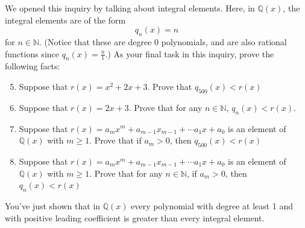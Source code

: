 \documentclass[11pt]{article}
\newenvironment{task}
	{\begin{mdframed}[linecolor=lightgray, linewidth=3pt]\raggedright}
	{\end{mdframed}}
\theoremstyle{definition}
\begin{document}
\begin{task}
We opened this inquiry by talking about integral elements. Here, in $\mathbb{Q}(x)$, the integral elements are of the form
\[ q_n(x) = n \]
for $n\in\mathbb{N}$. (Notice that these are degree 0 polynomials, and are also rational functions since $q_n(x) = \frac{n}{1}$.) As your final task in
this inquiry, prove the following facts:

\begin{enumerate}
    \setcounter{enumi}{4}
  \item Suppose that $r(x) =  x^2 + 2x + 3$. Prove that $q_{500}(x) < r(x)$
        \vspace{1.5in}
  \item Suppose that $r(x) =  2x + 3$. Prove that for any $n\in\mathbb{N}$, $q_n(x) < r(x)$.
        \vspace{1.5in}
  \item Suppose that $r(x) =  a_mx^m + a_{m-1}x_{m-1}+\cdots a_1x + a_0$ is an element
    of $\mathbb{Q}(x)$ with $m \geq 1$. Prove that if $a_m > 0$, then $q_{500}(x) < r(x)$
        \vspace{1.5in}
  \item Suppose that $r(x) =  a_mx^m + a_{m-1}x_{m-1}+\cdots a_1x + a_0$ is an element
    of $\mathbb{Q}(x)$ with $m \geq 1$. Prove that for any $n\in\mathbb{N}$, if $a_m > 0$, then $q_{n}(x) < r(x)$
        \vspace{1.5in}
\end{enumerate}

You've just shown that in $\mathbb{Q}(x)$ every polynomial with degree at least 1 and with positive leading coefficient is greater than every integral
element. 
\end{task}\newpage
\end{document}
